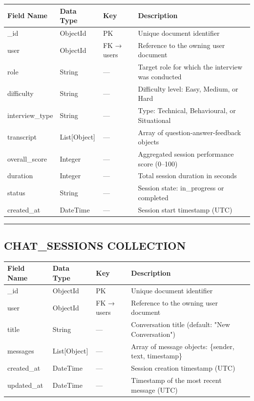 \documentclass[12pt]{article}
\begin{document}
\begin{longtable}{|p{}|p{}|p{}|p{}|}
\hline
\textbf{Field Name} & \textbf{Data Type} & \textbf{Key} & \textbf{Description} \\ \hline
\endhead
\_id & ObjectId & PK & Unique document identifier \\ \hline
user & ObjectId & FK → users & Reference to the owning user document \\ \hline
role & String & — & Target role for which the interview was conducted \\ \hline
difficulty & String & — & Difficulty level: Easy, Medium, or Hard \\ \hline
interview\_type & String & — & Type: Technical, Behavioural, or Situational \\ \hline
transcript & List[Object] & — & Array of question-answer-feedback objects \\ \hline
overall\_score & Integer & — & Aggregated session performance score (0–100) \\ \hline
duration & Integer & — & Total session duration in seconds \\ \hline
status & String & — & Session state: in\_progress or completed \\ \hline
created\_at & DateTime & — & Session start timestamp (UTC) \\ \hline
\end{longtable}


\noindent\rule{\textwidth}{0.4pt}

\subsection{CHAT\_SESSIONS COLLECTION}


\begin{longtable}{|p{}|p{}|p{}|p{}|}
\hline
\textbf{Field Name} & \textbf{Data Type} & \textbf{Key} & \textbf{Description} \\ \hline
\endhead
\_id & ObjectId & PK & Unique document identifier \\ \hline
user & ObjectId & FK → users & Reference to the owning user document \\ \hline
title & String & — & Conversation title (default: "New Conversation") \\ \hline
messages & List[Object] & — & Array of message objects: \{sender, text, timestamp\} \\ \hline
created\_at & DateTime & — & Session creation timestamp (UTC) \\ \hline
updated\_at & DateTime & — & Timestamp of the most recent message (UTC) \\ \hline
\end{longtable}
\end{document}
